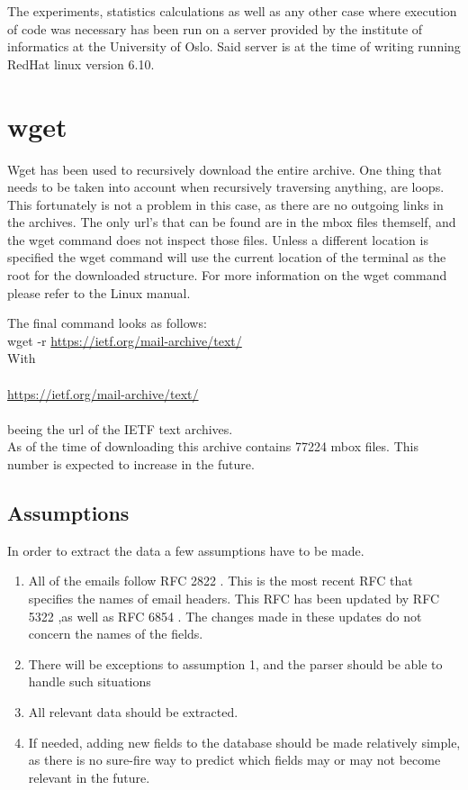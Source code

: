 \documentclass[a4paper,english]{report}
\begin{document}
The experiments, statistics calculations as well as any other case where execution of code was necessary has been run on a server provided by the institute of informatics at the University of Oslo.
Said server is at the time of writing  running RedHat linux version 6.10.


\section{wget}

Wget has been used to recursively download the entire archive.
One thing that needs to be taken into account when recursively traversing anything, are loops.
This fortunately is not a  problem in this case, as there are no outgoing links in the archives. The only url's that can be found are in the mbox files themself, and the wget command does not inspect those files.
Unless a different location is specified the wget command will use the current location of the terminal as the root for the downloaded structure.
For more information on the wget command please refer to the Linux manual.


\noindent
The final command looks as follows: \\

wget -r \url{ https://ietf.org/mail-archive/text/}\\

\noindent
With\\\\
  \url{ https://ietf.org/mail-archive/text/}\\\\
 beeing the url of the IETF text archives.\\

As of the time of downloading this archive contains 77224 mbox files. This number is expected to increase in the future.




\subsection{Assumptions}

In order to extract the data a few assumptions have to be made.

\begin{enumerate}

\item All of the emails follow RFC 2822 \cite{RFC2822}. This is the most recent RFC that specifies the names of email headers. This RFC has been updated by RFC 5322  \cite{RFC5322},as well as RFC 6854 \cite{RFC6854}. The changes made in these updates do not concern the names of the fields.
\item  There will be exceptions to assumption 1, and the parser should be able to handle such situations
\item All relevant data should be extracted.
\item If needed, adding new fields to the database should be made relatively simple, as there is no sure-fire way to predict which fields may or may not become relevant in the future. 
\end{enumerate}
\end{document}
